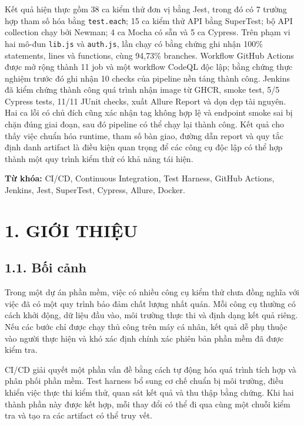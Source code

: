 \documentclass[
  vietnamese,
  12pt,
  a4paper,
  oneside]{report}
\begin{document}
Kết quả hiện thực gồm 38 ca kiểm thử đơn vị bằng Jest, trong đó có 7
trường hợp tham số hóa bằng \texttt{test.each}; 15 ca kiểm thử API bằng
SuperTest; bộ API collection chạy bởi Newman; 4 ca Mocha có sẵn và 5 ca
Cypress. Trên phạm vi hai mô-đun \texttt{lib.js} và \texttt{auth.js},
lần chạy có bằng chứng ghi nhận 100\% statements, lines và functions,
cùng 94,73\% branches. Workflow GitHub Actions được mở rộng thành 11 job
và một workflow CodeQL độc lập; bằng chứng thực nghiệm trước đó ghi nhận
10 checks của pipeline nền tảng thành công. Jenkins đã kiểm chứng thành
công quá trình nhận image từ GHCR, smoke test, 5/5 Cypress tests, 11/11
JUnit checks, xuất Allure Report và dọn dẹp tài nguyên. Hai ca lỗi có
chủ đích cũng xác nhận tag không hợp lệ và endpoint smoke sai bị chặn
đúng giai đoạn, sau đó pipeline có thể chạy lại thành công. Kết quả cho
thấy việc chuẩn hóa runtime, tham số bàn giao, đường dẫn report và quy
tắc định danh artifact là điều kiện quan trọng để các công cụ độc lập có
thể hợp thành một quy trình kiểm thử có khả năng tái hiện.

\textbf{Từ khóa:} CI/CD, Continuous Integration, Test Harness, GitHub
Actions, Jenkins, Jest, SuperTest, Cypress, Allure, Docker.

\chapter{1. GIỚI THIỆU}\label{1-giux1edbi-thiux1ec7u}

\section{1.1. Bối cảnh}\label{11-bux1ed1i-cux1ea3nh}

Trong một dự án phần mềm, việc có nhiều công cụ kiểm thử chưa đồng nghĩa
với việc đã có một quy trình bảo đảm chất lượng nhất quán. Mỗi công cụ
thường có cách khởi động, dữ liệu đầu vào, môi trường thực thi và định
dạng kết quả riêng. Nếu các bước chỉ được chạy thủ công trên máy cá
nhân, kết quả dễ phụ thuộc vào người thực hiện và khó xác định chính xác
phiên bản phần mềm đã được kiểm tra.

CI/CD giải quyết một phần vấn đề bằng cách tự động hóa quá trình tích
hợp và phân phối phần mềm. Test harness bổ sung cơ chế chuẩn bị môi
trường, điều khiển việc thực thi kiểm thử, quan sát kết quả và thu thập
bằng chứng. Khi hai thành phần này được kết hợp, mỗi thay đổi có thể đi
qua cùng một chuỗi kiểm tra và tạo ra các artifact có thể truy vết.
\end{document}
